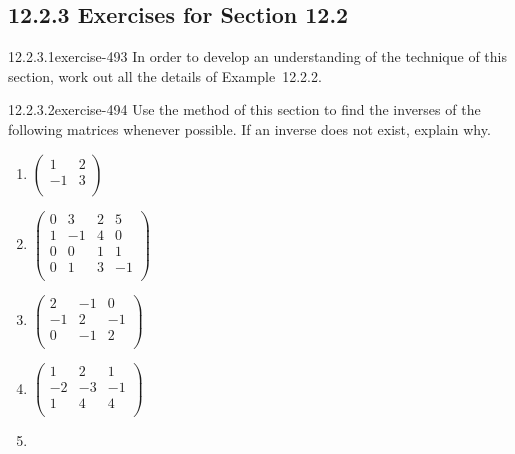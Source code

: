 \documentclass[twoside,10pt,]{book}
\numberwithin{equation}{section}
\begin{document}
\subsection*{12.2.3 Exercises for Section 12.2}
\begin{divisionsolution}{12.2.3.1}{}{exercise-493}%
\hypertarget{p-4432}{}%
In order to develop an understanding of the technique of this section, work out all the details of Example~12.2.2.%
\end{divisionsolution}%
\begin{divisionsolution}{12.2.3.2}{}{exercise-494}%
\hypertarget{p-4433}{}%
Use the method of this section to find the inverses of the following matrices whenever possible. If an inverse does not exist, explain why.\leavevmode%
\begin{multicols}{2}
\begin{enumerate}[label=(\alph*)]
\item\hypertarget{li-2030}{}\hypertarget{p-4434}{}%
\(\left(
\begin{array}{cc}
1 & 2 \\
-1 & 3 \\
\end{array}
\right)\)%
\item\hypertarget{li-2031}{}\hypertarget{p-4435}{}%
\(\left(
\begin{array}{cccc}
0 & 3 & 2 & 5 \\
1 & -1 & 4 & 0 \\
0 & 0 & 1 & 1 \\
0 & 1 & 3 & -1 \\
\end{array}
\right)\)%
\item\hypertarget{li-2032}{}\hypertarget{p-4436}{}%
\(\left(
\begin{array}{ccc}
2 & -1 & 0 \\
-1 & 2 & -1 \\
0 & -1 & 2 \\
\end{array}
\right)\)%
\item\hypertarget{li-2033}{}\hypertarget{p-4437}{}%
\(\left(
\begin{array}{ccc}
1 & 2 & 1 \\
-2 & -3 & -1 \\
1 & 4 & 4 \\
\end{array}
\right)\)%
\item\hypertarget{li-2034}{}\hypertarget{p-4438}{}%

\end{enumerate}
\end{multicols}
\end{divisionsolution}
\end{document}
